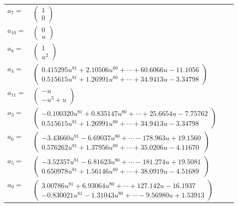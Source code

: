 \documentclass[1p]{elsarticle_modified}
\theoremstyle{definition}
\begin{document}
\begin{tabular}{m{7pt} m{180pt} m{7pt} m{180pt} }
\flushright $a_{7}=$&$\begin{pmatrix}1\\0\end{pmatrix}$ \\
\flushright $a_{10}=$&$\begin{pmatrix}0\\u\end{pmatrix}$ \\
\flushright $a_{8}=$&$\begin{pmatrix}1\\u^2\end{pmatrix}$ \\
\flushright $a_{4}=$&$\begin{pmatrix}0.415295 u^{81}+2.10506 u^{80}+\cdots+60.6066 u-11.1056\\0.515615 u^{81}+1.26991 u^{80}+\cdots+34.9413 u-3.34798\end{pmatrix}$ \\
\flushright $a_{11}=$&$\begin{pmatrix}- u\\- u^3+u\end{pmatrix}$ \\
\flushright $a_{3}=$&$\begin{pmatrix}-0.100320 u^{81}+0.835147 u^{80}+\cdots+25.6654 u-7.75762\\0.515615 u^{81}+1.26991 u^{80}+\cdots+34.9413 u-3.34798\end{pmatrix}$ \\
\flushright $a_{6}=$&$\begin{pmatrix}-3.43660 u^{81}-6.69037 u^{80}+\cdots-178.963 u+19.1560\\0.576262 u^{81}+1.37956 u^{80}+\cdots+35.0206 u-4.11670\end{pmatrix}$ \\
\flushright $a_{5}=$&$\begin{pmatrix}-3.52357 u^{81}-6.81623 u^{80}+\cdots-181.274 u+19.5081\\0.650978 u^{81}+1.56146 u^{80}+\cdots+38.0919 u-4.51689\end{pmatrix}$ \\
\flushright $a_{9}=$&$\begin{pmatrix}3.00786 u^{81}+6.93064 u^{80}+\cdots+127.142 u-16.1937\\-0.830021 u^{81}-1.31043 u^{80}+\cdots-9.56980 u+1.53913\end{pmatrix}$ \\

\end{tabular}
\end{document}
